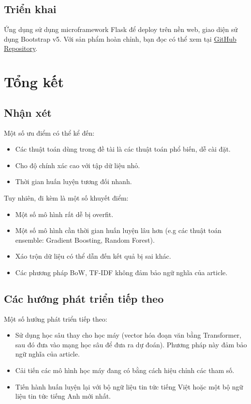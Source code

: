 \documentclass[12pt]{article}
\begin{document}
\subsection{Triển khai}
Ứng dụng sử dụng microframework Flask để deploy trên nền web, giao diện sử dụng Bootstrap v5. Với sản phẩm hoàn chỉnh, bạn đọc có thể xem tại \href{https://github.com/trhgquan/fakenews-detection}{GitHub Repository}.

\section{Tổng kết}
\subsection{Nhận xét}
Một số ưu điểm có thể kể đến:
\begin{itemize}
\item Các thuật toán dùng trong đề tài là các thuật toán phổ biến, dễ cài đặt.
\item Cho độ chính xác cao với tập dữ liệu nhỏ.
\item Thời gian huấn luyện tương đối nhanh.
\end{itemize}
Tuy nhiên, đi kèm là một số khuyết điểm:
\begin{itemize}
\item Một số mô hình rất dễ bị overfit.
\item Một số mô hình cần thời gian huấn luyện lâu hơn (e.g các thuật toán ensemble: Gradient Boosting, Random Forest).
\item Xáo trộn dữ liệu có thể dẫn đến kết quả bị sai khác.\cite{Kowsari_2019}
\item Các phương pháp BoW, TF-IDF không đảm bảo ngữ nghĩa của article.
\end{itemize}

\subsection{Các hướng phát triển tiếp theo}
Một số hướng phát triển tiếp theo:
\begin{itemize}
\item Sử dụng học sâu thay cho học máy (vector hóa đoạn văn bằng Transformer, sau đó đưa vào mạng học sâu để đưa ra dự đoán). Phương pháp này đảm bảo ngữ nghĩa của article.
\item Cải tiến các mô hình học máy đang có bằng cách hiệu chỉnh các tham số.
\item Tiến hành huấn luyện lại với bộ ngữ liệu tin tức tiếng Việt hoặc một bộ ngữ liệu tin tức tiếng Anh mới nhất.
\end{itemize}

\cleardoublepage
{}
{}


\end{document}
